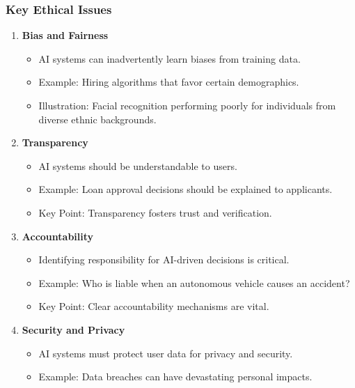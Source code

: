 \documentclass{beamer}
\begin{document}
\begin{frame}[fragile]
    \frametitle{Key Ethical Issues}
    \begin{enumerate}
        \item \textbf{Bias and Fairness}
        \begin{itemize}
            \item AI systems can inadvertently learn biases from training data.
            \item Example: Hiring algorithms that favor certain demographics.
            \item Illustration: Facial recognition performing poorly for individuals from diverse ethnic backgrounds.
        \end{itemize}
        
        \item \textbf{Transparency}
        \begin{itemize}
            \item AI systems should be understandable to users.
            \item Example: Loan approval decisions should be explained to applicants.
            \item Key Point: Transparency fosters trust and verification.
        \end{itemize}
        
        \item \textbf{Accountability}
        \begin{itemize}
            \item Identifying responsibility for AI-driven decisions is critical.
            \item Example: Who is liable when an autonomous vehicle causes an accident?
            \item Key Point: Clear accountability mechanisms are vital.
        \end{itemize}
        
        \item \textbf{Security and Privacy}
        \begin{itemize}
            \item AI systems must protect user data for privacy and security.
            \item Example: Data breaches can have devastating personal impacts.
        \end{itemize}
    \end{enumerate}
\end{frame}
\end{document}

